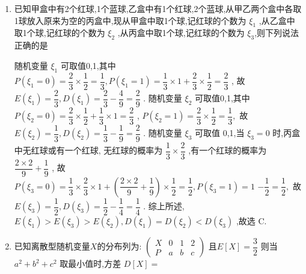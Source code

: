 \begin{enumerate}
    \item 已知甲盒中有2个红球,1个蓝球,乙盒中有1个红球,2个蓝球,从甲乙两个盒中各取1球放入原来为空的丙盒中,现从甲盒中取1个球,记红球的个数为 $\xi_{1}$ ,从乙盒中取1个球,记红球的个数为 $\xi_{2}$ ,从丙盒中取1个球,记红球的个数为 $\xi_{3}$,则下列说法正确的是
    \begin{jieda}
        随机变量 ${\xi }_{1}$ 可取值0,1,其中 $P\left( {{\xi }_{1} = 0}\right)  = \dfrac{2}{3} \times  \dfrac{1}{2} = \dfrac{1}{3},P\left( {{\xi }_{1} = 1}\right)  = \dfrac{1}{3} \times  1 + \dfrac{2}{3} \times  \dfrac{1}{2} = \dfrac{2}{3}$ ,
    故 $E\left( {\xi }_{1}\right)  = \dfrac{2}{3},D\left( {\xi }_{1}\right)  = \dfrac{2}{3} - \dfrac{4}{9} = \dfrac{2}{9}$ .
    随机变量 ${\xi }_{2}$ 可取值0,1,其中 $P\left( {{\xi }_{2} = 0}\right)  = \dfrac{2}{3} \times  \dfrac{1}{2} + \dfrac{1}{3} \times  1 = \dfrac{2}{3}$ ,
    $P\left( {{\xi }_{2} = 1}\right)  = \dfrac{2}{3} \times  \dfrac{1}{2} = \dfrac{1}{3},$
    故 $E\left( {\xi }_{2}\right)  = \dfrac{1}{3},D\left( {\xi }_{2}\right)  = \dfrac{1}{3} - \dfrac{1}{9} = \dfrac{2}{9}$ .
    随机变量 ${\xi }_{3}$ 可取值 0,1,当 ${\xi }_{3} = 0$ 时,丙盒中无红球或有一个红球,
    无红球的概率为 $\dfrac{1}{3} \times  \dfrac{2}{3}$ ,有一个红球的概率为 $\dfrac{2 \times  2}{9} + \dfrac{1}{9}$ ,
    故 $P\left( {{\xi }_{3} = 0}\right)  = \dfrac{1}{3} \times  \dfrac{2}{3} \times  1 + \left( {\dfrac{2 \times  2}{9} + \dfrac{1}{9}}\right)  \times  \dfrac{1}{2} = \dfrac{1}{2},P\left( {{\xi }_{3} = 1}\right)  = 1$
    $- \dfrac{1}{2} = \dfrac{1}{2},$
    故 $E\left( {\xi }_{3}\right)  = \dfrac{1}{2},D\left( {\xi }_{3}\right)  = \dfrac{1}{2} - \dfrac{1}{4} = \dfrac{1}{4}$ .
    综上所述, $E\left( {\xi }_{1}\right)  > E\left( {\xi }_{3}\right)  > E\left( {\xi }_{2}\right) ,D\left( {\xi }_{1}\right)  = D\left( {\xi }_{2}\right)  < D\left( {\xi }_{3}\right)$ ,故选 C.
    \end{jieda}

    \item 已知离散型随机变量$X$的分布列为: $\begin{pmatrix}X&0&1&2\\ P&a&b&c\end{pmatrix}$ 且$E[X]=\dfrac{3}{2}$ 则当$a^{2}+b^{2}+c^{2}$ 取最小值时,方差 $D[X]=$


\end{enumerate}
